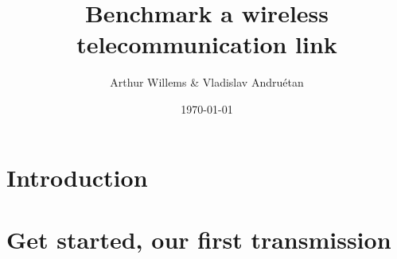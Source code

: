 \documentclass{article}
\title{Benchmark a wireless telecommunication link}
\author{Arthur Willems \& Vladislav Andruétan}
\date{\today}
\begin{document}
\maketitle{} %

\pagebreak

\section{Introduction}



\section{Get started, our first transmission}


\end{document}
